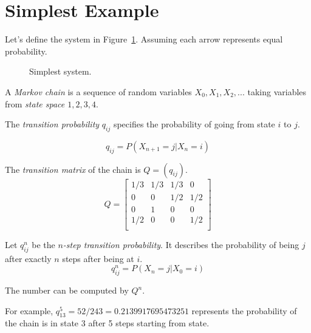 \documentclass[fleqn]{article}
\begin{document}
\section{Simplest Example}

Let's define the system in Figure~\ref{fig:1}.
Assuming each arrow represents equal probability.
\begin{figure}[h]\centering
{}\caption{Simplest system.}\label{fig:1}
\end{figure}

A \emph{Markov chain} is a sequence of random variables $X_0,X_1,X_2,...$ taking variables from \emph{state space ${1,2,3,4}$}.

The \emph{transition probability} $q_{ij}$ specifies the probability of going from state $i$ to $j$.

\begin{equation}
q_{ij} = P( X_{n+1}=j | X_n=i )
\end{equation}

The \emph{transition matrix} of the chain is $Q=(q_{ij})$.
\begin{equation}
Q  = \begin{bmatrix}
    1/3 & 1/3 & 1/3 & 0   \\
    0   & 0   & 1/2 & 1/2 \\
    0   & 1   & 0   & 0   \\
    1/2 & 0   & 0   & 1/2 \\
\end{bmatrix}
\end{equation}

Let $q_{ij}^n$ be the \emph{$n$-step transition probability}. It describes the probability of being $j$ after exactly $n$ steps after being at $i$.
\begin{equation}
    q_{ij}^n = P( X_n=j | X_0=i )
\end{equation}

The number can be computed by $Q^n$.

For example,  $q_{13}^5 = 52/243 = 0.2139917695473251$ represents the probability of the chain is in state 3 after 5 steps starting from state.
\end{document}
